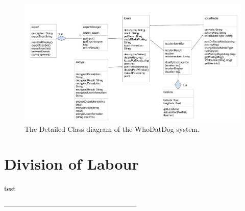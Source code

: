 \documentclass[]{article}
\begin{document}
\begin{figure}[H]
	\centering
	\includegraphics[width=\textwidth]{DetailClassDiagram.pdf}
	\caption{\label{fig:analysisclassdiagram}The Detailed Class diagram of the WhoDatDog system.}
\end{figure}

\appendix
\section{Division of Labour}


test

\newpage
--------------------------------------------------------
\end{document}
